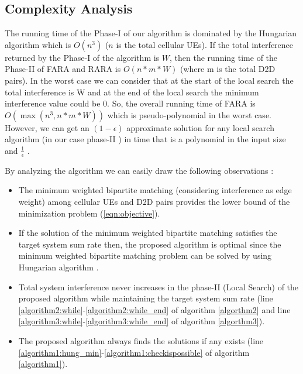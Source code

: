 \documentclass{ieeeaccess}
\begin{document}
\subsection{Complexity Analysis} \label{subsection: Analysis}
\smallskip
 
The running time of the Phase-I of our algorithm is dominated by the Hungarian algorithm which is $O(n^3)$ \cite{hungarian} ($n$ is the total cellular UEs). If the total interference returned by the Phase-I of the algorithm is $W$, then the running time of the Phase-II of FARA and RARA is $O(n*m*W)$ (where m is the total D2D pairs). In the worst case we can consider that at the start of the local search the total interference is W and at the end of the local search the minimum interference value could be $0$. So, the overall running time of FARA is $O(\max(n^3, n*m*W))$ which is pseudo-polynomial in the worst case. However, we can get an $(1 - \epsilon)$ approximate solution for any local search algorithm (in our case phase-II ) in time that is a polynomial in the input size and $\frac{1}{\epsilon}$ \cite{orlin}.

\smallskip

 By analyzing the algorithm we can easily draw the following observations :

\begin {itemize}

\item The minimum weighted bipartite matching (considering interference as edge weight) among cellular UEs and D2D pairs provides the lower bound of the minimization problem (\ref{eqn:objective}).

\item If the solution of the minimum weighted bipartite matching satisfies the target system sum rate then, the proposed algorithm is optimal since the minimum weighted bipartite matching problem can be solved by using Hungarian algorithm \cite{hungarian}.

\item Total system interference never increases in the phase-II (Local Search) of the proposed algorithm while maintaining the target system sum rate (line \ref{algorithm2:while}-\ref{algorithm2:while_end} of algorithm \ref{algorthm2} and line \ref{algorithm3:while}-\ref{algorithm3:while_end} of algorithm \ref{algorthm3}).  

\item The proposed algorithm always finds the solutions if any exists (line \ref{algorithm1:hung_min}-\ref{algorithm1:checkispossible} of algorithm \ref{algorithm1}).


\end{itemize}
\end{document}
